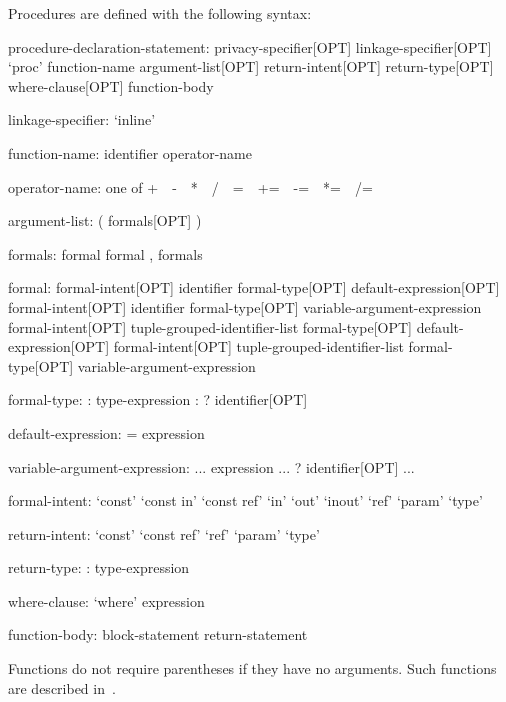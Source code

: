 Procedures are defined with the following syntax:
\begin{syntax}
procedure-declaration-statement:
  privacy-specifier[OPT] linkage-specifier[OPT] `proc' function-name argument-list[OPT] return-intent[OPT] return-type[OPT] where-clause[OPT]
    function-body

linkage-specifier:
  `inline'

function-name:
  identifier
  operator-name

operator-name: one of
  + $ $ $ $ - $ $ $ $ * $ $ $ $ / $ $ $ $ %
  = $ $ $ $ += $ $ $ $ -= $ $ $ $ *= $ $ $ $ /= $ $ $ $ %

argument-list:
  ( formals[OPT] )

formals:
  formal
  formal , formals

formal:
  formal-intent[OPT] identifier formal-type[OPT] default-expression[OPT]
  formal-intent[OPT] identifier formal-type[OPT] variable-argument-expression
  formal-intent[OPT] tuple-grouped-identifier-list formal-type[OPT] default-expression[OPT]
  formal-intent[OPT] tuple-grouped-identifier-list formal-type[OPT] variable-argument-expression

formal-type:
  : type-expression
  : ? identifier[OPT]

default-expression:
  = expression

variable-argument-expression:
  ... expression
  ... ? identifier[OPT]
  ...

formal-intent:
  `const'
  `const in'
  `const ref'
  `in'
  `out'
  `inout'
  `ref'
  `param'
  `type'

return-intent:
  `const'
  `const ref'
  `ref'
  `param'
  `type'

return-type:
  : type-expression

where-clause:
  `where' expression

function-body:
  block-statement
  return-statement
\end{syntax}


Functions do not require parentheses if they have no arguments.  Such
functions are described in~.

